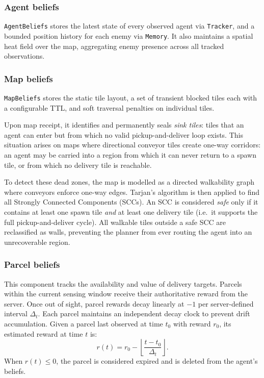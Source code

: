 \subsubsection{Agent beliefs}
\texttt{AgentBeliefs} stores the latest state of every observed agent via \texttt{Tracker}, and a bounded position history for each enemy via \texttt{Memory}.
It also maintains a spatial heat field over the map, aggregating enemy presence across all tracked observations.

\subsubsection{Map beliefs}
\texttt{MapBeliefs} stores the static tile layout, a set of transient blocked tiles each with a configurable TTL, and soft traversal penalties on individual tiles.

Upon map receipt, it identifies and permanently seals \emph{sink tiles}: tiles that an agent can enter but from which no valid pickup-and-deliver loop exists.
This situation arises on maps where directional conveyor tiles create one-way corridors: an agent may be carried into a region
from which it can never return to a spawn tile, or from which no delivery tile is reachable.

To detect these dead zones, the map is modelled as a directed walkability graph where conveyors enforce one-way edges.
Tarjan's algorithm is then applied to find all Strongly Connected Components (SCCs).
An SCC is considered \emph{safe} only if it contains at least one spawn tile \emph{and} at least one delivery tile (i.e.\ it supports the full pickup-and-deliver cycle).
All walkable tiles outside a safe SCC are reclassified as walls, preventing the planner from ever routing the agent into an unrecoverable region.


\subsubsection{Parcel beliefs}
This component tracks the availability and value of delivery targets.
Parcels within the current sensing window receive their authoritative reward from the server.
Once out of sight, parcel rewards decay linearly at $-1$ per server-defined interval $\Delta_t$.
Each parcel maintains an independent decay clock to prevent drift accumulation.
Given a parcel last observed at time $t_0$ with reward $r_0$, its estimated reward at time $t$ is:
\begin{equation}
r(t) = r_0 - \left\lfloor\frac{t - t_0}{\Delta_t}\right\rfloor.
\label{eq:decay}
\end{equation}
When $r(t) \leq 0$, the parcel is considered expired and is deleted from the agent's beliefs.

